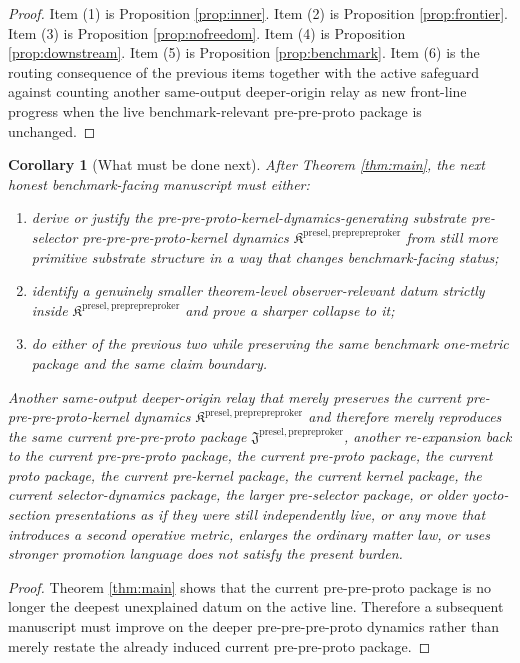 \documentclass[11pt]{article}
\newcommand{\PrePreProtoKernelPackage}{\mathfrak J^{\mathrm{presel,prepreproker}}}
\newcommand{\PrePrePreProtoKernelPackage}{\mathfrak K^{\mathrm{presel,preprepreproker}}}
\newtheorem{corollary}{Corollary}
\begin{document}
\begin{proof}
Item (1) is Proposition \ref{prop:inner}. Item (2) is Proposition \ref{prop:frontier}. Item (3) is Proposition \ref{prop:nofreedom}. Item (4) is Proposition \ref{prop:downstream}. Item (5) is Proposition \ref{prop:benchmark}. Item (6) is the routing consequence of the previous items together with the active safeguard against counting another same-output deeper-origin relay as new front-line progress when the live benchmark-relevant pre-pre-proto package is unchanged.
\end{proof}

\begin{corollary}[What must be done next]
\label{cor:next}
After Theorem \ref{thm:main}, the next honest benchmark-facing manuscript must either:
\begin{enumerate}
    \item derive or justify the pre-pre-proto-kernel-dynamics-generating substrate pre-selector pre-pre-pre-proto-kernel dynamics \(\PrePrePreProtoKernelPackage\) from still more primitive substrate structure in a way that changes benchmark-facing status;
    \item identify a genuinely smaller theorem-level observer-relevant datum strictly inside \(\PrePrePreProtoKernelPackage\) and prove a sharper collapse to it;
    \item do either of the previous two while preserving the same benchmark one-metric package and the same claim boundary.
\end{enumerate}
Another same-output deeper-origin relay that merely preserves the current pre-pre-pre-proto-kernel dynamics \(\PrePrePreProtoKernelPackage\) and therefore merely reproduces the same current pre-pre-proto package \(\PrePreProtoKernelPackage\), another re-expansion back to the current pre-pre-proto package, the current pre-proto package, the current proto package, the current pre-kernel package, the current kernel package, the current selector-dynamics package, the larger pre-selector package, or older yocto-section presentations as if they were still independently live, or any move that introduces a second operative metric, enlarges the ordinary matter law, or uses stronger promotion language does not satisfy the present burden.
\end{corollary}

\begin{proof}
Theorem \ref{thm:main} shows that the current pre-pre-proto package is no longer the deepest unexplained datum on the active line. Therefore a subsequent manuscript must improve on the deeper pre-pre-pre-proto dynamics rather than merely restate the already induced current pre-pre-proto package.
\end{proof}
\end{document}
